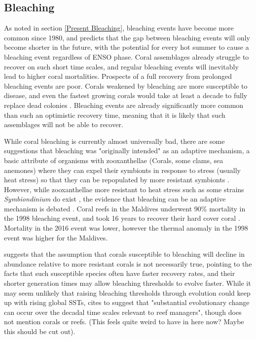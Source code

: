 \documentclass[11pt,a4paper]{article}
\begin{document}
\subsection{Bleaching}

As noted in section \ref{Present Bleaching}, bleaching events have become more common since 1980, and \cite{Hughes2018a} predicts that the gap between bleaching events will only become shorter in the future, with the potential for every hot summer to cause a bleaching event regardless of ENSO phase. Coral assemblages already struggle to recover on such short time scales, and regular bleaching events will inevitably lead to higher coral mortalities. Prospects of a full recovery from prolonged bleaching events are poor. Corals weakened by bleaching are more susceptible to disease, and even the fastest growing corals would take at least a decade to fully replace dead colonies \citep{Hughes2018b}. %
Bleaching events are already significantly more common than such an optimistic recovery time, meaning that it is likely that such assemblages will not be able to recover.


While coral bleaching is currently almost universally bad, there are some suggestions that bleaching was "originally intended" as an adaptive mechanism, a basic attribute of organisms with zooxanthellae (Corals, some clams, sea anemones) where they can expel their symbionts in response to  stress (usually heat stress) so that they can be repopulated by more resistant symbionts \citep{Buddemeier1993}. However, while zooxanthellae more resistant to heat stress such as some strains \textit{Symbiondinium} do exist \citep{Sotka2005}, the evidence that bleaching can be an adaptive mechanism \citep{Baker2001} is debated \citep{Coles2003}. Coral reefs in the Maldives underwent 90\% mortality in the 1998 bleaching event, and took 16 years to recover their hard cover coral \citep{Montefalcone2020}. Mortality in the 2016 event was lower, however the thermal anomaly in the 1998 event was higher for the Maldives.

\cite{Pandolfi2011} suggests that the assumption that corals susceptible to bleaching will decline in abundance relative to more resistant corals is not necessarily true, pointing to the facts that such susceptible species often have faster recovery rates, and their shorter generation times may allow bleaching thresholds to evolve faster. While it may seem unlikely that raising bleaching thresholds through evolution could keep up with rising global SSTs, \cite{Pandolfi2011} cites \cite{Stockwell2003} to suggest that "substantial evolutionary change can occur over the decadal time scales relevant to reef managers", though \cite{Stockwell2003} does not mention corals or reefs. (This feels quite weird to have in here now? Maybe this should be cut out).
\end{document}
